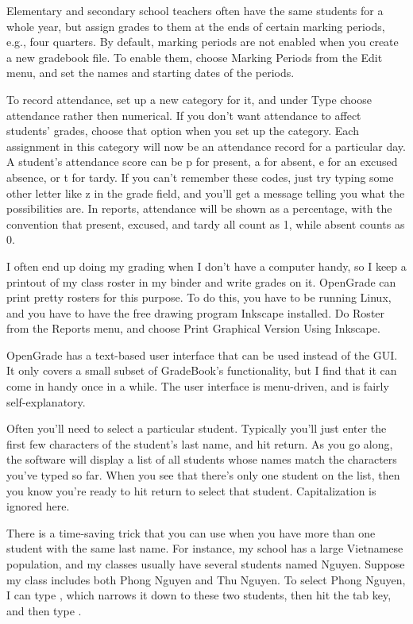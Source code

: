 \documentclass{opengrade_doc}
\begin{document}
Elementary and secondary school teachers often have the same students for a whole year,
but assign grades to them at the ends of certain marking periods, e.g., four quarters.
By default, marking periods are not enabled when you create a new gradebook file.
To enable them, choose Marking Periods from the Edit menu, and set the names and starting
dates of the periods.

To record attendance, set up a new category for it, and under Type choose attendance
rather then numerical. If you don't want attendance to affect students' grades,
choose that option when you set up the category. Each assignment in this category will now be an attendance
record for a particular day. A student's attendance score can be p for present,
a for absent, e for an excused absence, or t for tardy. If you can't remember these
codes, just try typing some other letter like z in the grade field, and you'll get
a message telling you what the possibilities are. In reports, attendance will be
shown as a percentage, with the convention that present, excused, and tardy all
count as 1, while absent counts as 0.

I often end up doing my grading when I don't have a computer handy, so I keep a printout
of my class roster in my binder and write grades on it. OpenGrade can print pretty
rosters for this purpose. To do this, you have to be running Linux, and you have to
have the free drawing program Inkscape installed. Do Roster from the Reports menu,
and choose Print Graphical Version Using Inkscape.

\label{textui}
OpenGrade has a text-based user interface that can be used instead of the GUI.
It only covers a small subset of GradeBook's functionality,
but I find that it can come in handy once in a while.
The user interface is menu-driven, and is fairly self-explanatory.

Often you'll need to select a particular student. Typically
you'll just enter the first few characters of the student's last name,
and hit return. As you go along, the software will display a list of
all students whose names match the characters you've typed so far. When
you see that there's only one student on the list, then you know you're
ready to hit return to select that student. Capitalization is ignored
here.

There is a time-saving trick that you can use when you have more than
one student with the same last name. For instance, my school has a large
Vietnamese population, and my classes usually have several students named
Nguyen. Suppose my class includes both Phong Nguyen and
Thu Nguyen. To select Phong Nguyen, I can type \verb@ng@, which narrows
it down to these two students, then hit the tab key, and then type \verb@p@.
\end{document}
